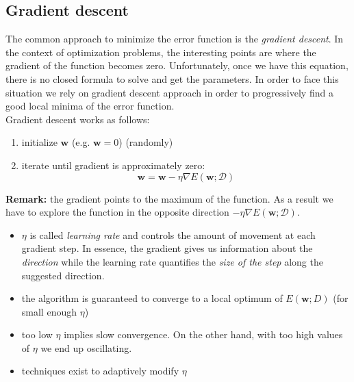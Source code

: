 \subsection{Gradient descent}
The common approach to minimize the error function is the \textit{gradient
descent}. In the context of optimization problems, the interesting points are
where the gradient of the function becomes zero. Unfortunately, once we have
this equation, there is no closed formula to solve and get the parameters. In
order to face this situation we rely on gradient descent approach in order to
progressively find a good local minima of the error function.\\ Gradient descent
works as follows:
\begin{enumerate}
	\item initialize $\pmb{w}$ (e.g. $\pmb{w}=0$) (randomly)

	\item iterate until gradient is approximately zero:
		\begin{equation}
			\label{eq:gradient_descent}\pmb{w}= \pmb{w}- \eta \nabla E(\pmb{w}; \mathcal{D}
			)
		\end{equation}
\end{enumerate}

\textbf{Remark:} the gradient points to the maximum of the function. As a result
we have to explore the function in the opposite direction
$- \eta \nabla E(\pmb{w}; \mathcal{D})$.

\begin{itemize}
	\item $\eta$ is called \textit{learning rate} and controls the amount of
		movement at each gradient step. In essence, the gradient gives us
		information about the \textit{direction} while the learning rate quantifies the
		\textit{size of the step} along the suggested direction.

	\item the algorithm is guaranteed to converge to a local optimum of $E(\pmb{w};
		\mathit{D})$ (for small enough $\eta$)

	\item too low $\eta$ implies slow convergence. On the other hand, with too high
		values of $\eta$ we end up oscillating.

	\item techniques exist to adaptively modify $\eta$
\end{itemize}

